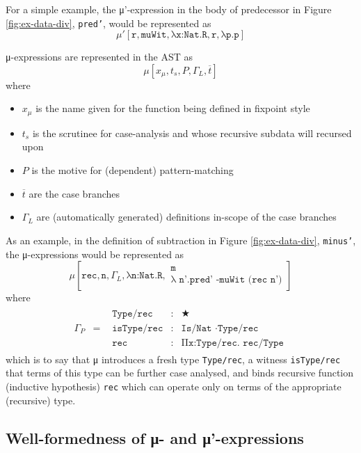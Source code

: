 \documentclass{article}
\newcommand{\mupsche}[4]{μ'[#1,#2,#3,#4]}
\newcommand{\musche}[5]{μ[#1,#2,#3,#4,#5]}
\newcommand{\vars}[1]{{\overline{#1}}}
\begin{document}
For a simple example, the μ'-expression in the body of predecessor in Figure
\ref{fig:ex-data-div}, \texttt{pred'}, would be represented as
\[
  \mupsche{\texttt{r}}{\texttt{muWit}}{\texttt{λx:Nat.R}}{
    \texttt{r}, \texttt{λp.p}
  }
\]

μ-expressions are represented in the AST as
\[
  \musche{x_μ}{t_s}{P}{\Gamma_L}{\vars{t}}
\]
\noindent where
\begin{itemize}
\item $x_{μ}$ is the name given for the function being defined in fixpoint style
\item $t_s$ is the scrutinee for case-analysis and whose recursive subdata will
  recursed upon
\item $P$ is the motive for (dependent) pattern-matching
\item $\vars{t}$ are the case branches
\item $\Gamma_L$ are (automatically generated) definitions in-scope of the case
  branches
\end{itemize}

As an example, in the definition of subtraction in Figure
\ref{fig:ex-data-div}, \texttt{minus'}, the μ-expressions would be represented
as
\[
  \musche{\texttt{rec}}{\texttt{n}}{\Gamma_L}{\texttt{λn:Nat.R}}
  {\begin{array}{c}
     \texttt{m}
     \\ \texttt{λ n'.pred' -muWit (rec n')}
   \end{array}
    }
\]
\noindent where
\[
  \begin{array}{lcl}
    \Gamma_P
    & =
    & \begin{array}{lcl}
        \texttt{Type/rec} & : & ★
        \\ \texttt{isType/rec} & : & \texttt{Is/Nat ·Type/rec}
        \\ \texttt{rec} & : & \texttt{Πx:Type/rec. rec/Type}
      \end{array}
  \end{array}
\]
\noindent which is to say that μ introduces a fresh type \texttt{Type/rec}, a
witness \texttt{isType/rec} that terms of this type can be further case
analysed, and binds recursive function (inductive hypothesis) \texttt{rec} which
can operate only on terms of the appropriate (recursive) type.

\subsection{Well-formedness of μ- and μ'-expressions}
\end{document}
